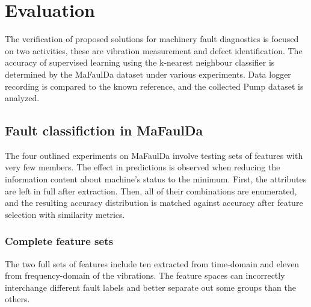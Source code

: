 \chapter{Evaluation} \label{chapter:evaluation}
The verification of proposed solutions for machinery fault diagnostics is focused on two activities, these are vibration measurement and defect identification. The accuracy of supervised learning using the k-nearest neighbour classifier is determined by the MaFaulDa dataset under various experiments. Data logger recording is compared to the known reference, and the collected Pump dataset is analyzed.

\section{Fault classifiction in MaFaulDa}
The four outlined experiments on MaFaulDa involve testing sets of features with very few members. The effect in predictions is observed when reducing the information content about machine's status to the minimum. First, the attributes are left in full after extraction. Then, all of their combinations are enumerated, and the resulting accuracy distribution is matched against accuracy after feature selection with similarity metrics. 

\subsection{Complete feature sets}
The two full sets of features include ten extracted from time-domain and eleven from frequency-domain of the vibrations. The feature spaces can incorrectly interchange different fault labels and better separate out some groups than the others. 

